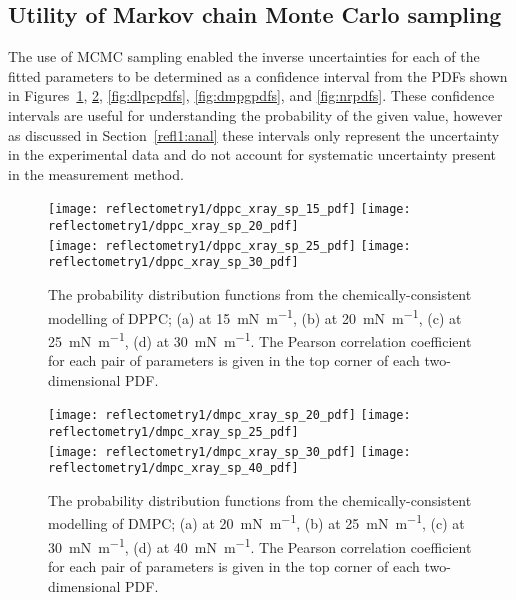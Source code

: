 \subsection{Utility of Markov chain Monte Carlo sampling}
The use of MCMC sampling enabled the inverse uncertainties for each of the fitted parameters to be determined as a confidence interval from the PDFs shown in Figures~\ref{fig:dppcpdfs}, \ref{fig:dmpcpdfs}, \ref{fig:dlpcpdfs}, \ref{fig:dmpgpdfs}, and \ref{fig:nrpdfs}.
These confidence intervals are useful for understanding the probability of the given value, however as discussed in Section~\ref{refl1:anal} these intervals only represent the uncertainty in the experimental data and do not account for systematic uncertainty present in the measurement method.
%
\begin{figure}
    \centering
    \texttt{[image: reflectometry1/dppc\_xray\_sp\_15\_pdf]}
    \texttt{[image: reflectometry1/dppc\_xray\_sp\_20\_pdf]} \\
    \texttt{[image: reflectometry1/dppc\_xray\_sp\_25\_pdf]}
    \texttt{[image: reflectometry1/dppc\_xray\_sp\_30\_pdf]}
    \caption{The probability distribution functions from the chemically-consistent modelling of DPPC; (a) at \SI{15}{\milli\newton\per\meter}, (b) at \SI{20}{\milli\newton\per\meter}, (c) at \SI{25}{\milli\newton\per\meter}, (d) at \SI{30}{\milli\newton\per\meter}. The Pearson correlation coefficient for each pair of parameters is given in the top corner of each two-dimensional PDF.}
    \label{fig:dppcpdfs}
\end{figure}
%
%
\begin{figure}
    \centering
    \texttt{[image: reflectometry1/dmpc\_xray\_sp\_20\_pdf]}
    \texttt{[image: reflectometry1/dmpc\_xray\_sp\_25\_pdf]} \\
    \texttt{[image: reflectometry1/dmpc\_xray\_sp\_30\_pdf]}
    \texttt{[image: reflectometry1/dmpc\_xray\_sp\_40\_pdf]}
    \caption{The probability distribution functions from the chemically-consistent modelling of DMPC; (a) at \SI{20}{\milli\newton\per\meter}, (b) at \SI{25}{\milli\newton\per\meter}, (c) at \SI{30}{\milli\newton\per\meter}, (d) at \SI{40}{\milli\newton\per\meter}. The Pearson correlation coefficient for each pair of parameters is given in the top corner of each two-dimensional PDF.}
    \label{fig:dmpcpdfs}
\end{figure}
%
%

